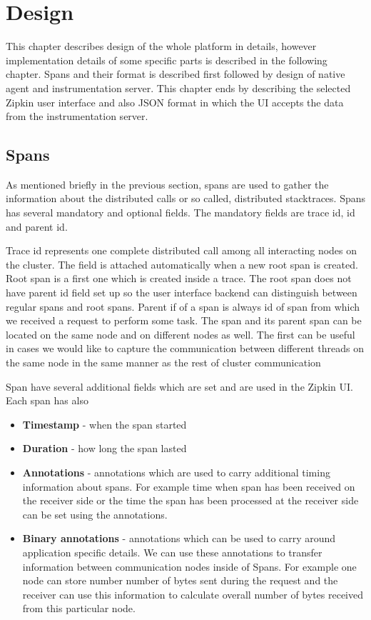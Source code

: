 \chapter{Design}
This chapter describes design of the whole platform in details, however implementation details of some specific parts is described in the following chapter. Spans and their format is described first followed by design of native agent and instrumentation server. This chapter ends by describing the selected Zipkin user interface and also JSON format in which the UI accepts the data from the instrumentation server.
\label{chap:design}

\section{Spans}
\label{subsec:spans}
As mentioned briefly in the previous section, spans are used to gather the information about the distributed calls or so called, distributed stacktraces. Spans has several mandatory and optional fields. The mandatory fields are trace id, id and parent id.

Trace id represents one complete distributed call among all interacting nodes on the cluster. The field is attached automatically when a new root span is created. Root span is a first one which is created inside a trace. The root span does not have parent id field set up so the user interface backend can distinguish between regular spans and root spans. Parent if of a span is always id of span from which we received a request to perform some task. The span and its parent span can be located on the same node and on different nodes as well. The first can be useful in cases we would like to capture the communication between different threads on the same node in the same manner as the rest of cluster communication

Span have several additional fields which are set and are used in the Zipkin UI. Each span has also
\begin{itemize}
	\item \textbf{Timestamp} - when the span started
	\item \textbf{Duration} - how long the span lasted
	\item \textbf{Annotations} - annotations which are used to carry additional timing information about spans. For example time when span has been received on the receiver side or the time the span has been processed at the receiver side can be set using the annotations.
	\item \textbf{Binary annotations} - annotations which can be used to carry around application specific details. We can use these annotations to transfer information between communication nodes inside of Spans. For example one node can store number number of bytes sent during the request and the receiver can use this information to calculate overall number of bytes received from this particular node.
\end{itemize}

